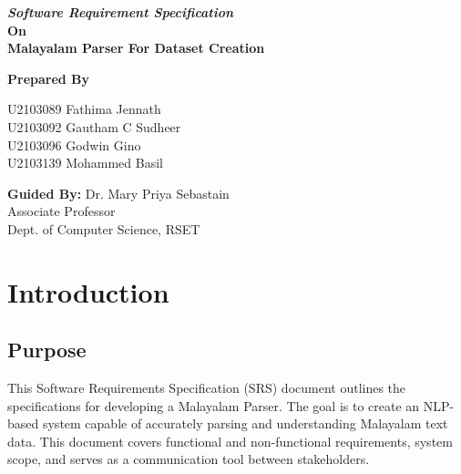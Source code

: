 \documentclass[12pt]{article}
\begin{document}
	\newpage
	
	\begin{center}
		
		
		\textbf{\textit{
				{\fontsize{16pt}{19.2pt}\selectfont
					Software Requirement Specification}}\medskip
			{\fontsize{14pt}{16.8pt}\selectfont
				\\On\medskip\\Malayalam Parser For Dataset Creation}
		}
		
		\bigskip
		
		{
			
			\textbf{{\fontsize{14pt}{16.8pt}\selectfont Prepared By\\}}
			
			U2103089 Fathima Jennath\\
			U2103092 Gautham C Sudheer\\
			U2103096 Godwin Gino\\
			U2103139 Mohammed Basil\\
		}
	
		\bigskip \bigskip \bigskip
	
	
		{\fontsize{16pt}{19.2pt}\selectfont \textbf{Guided By: } Dr. Mary Priya Sebastain\\
		\hspace{1.8cm}Associate Professor\\
		\hspace{5.2cm}Dept. of Computer Science, RSET\\}
		
	\end{center}
	
	\newpage
	\pagestyle{headerstyle}
	
	\tableofcontents
	
	\newpage
	\setcounter{page}{1}
	
	\section{Introduction}
	
	\subsection{Purpose}
	This Software Requirements Specification (SRS) document outlines the specifications for
	developing a Malayalam Parser. The goal is to create an NLP-based system capable of
	accurately parsing and understanding Malayalam text data. This document covers
	functional and non-functional requirements, system scope, and serves as a communication
	tool between stakeholders.
	
\end{document}
